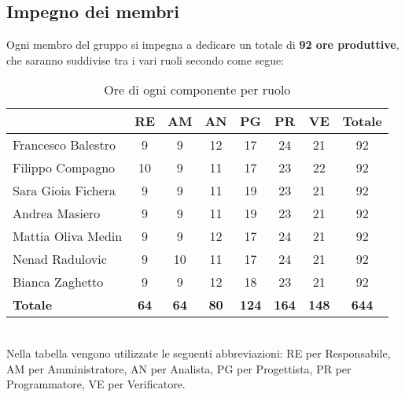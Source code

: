 \documentclass[a4paper,12pt]{article}
\begin{document}
{        \subsection{Impegno dei membri} {
            Ogni membro del gruppo si impegna a dedicare un totale di \textbf{92 ore produttive}, che saranno suddivise tra i vari ruoli secondo come segue:\\
            \begin{table}[h!]
                \centering
                \begin{tabularx}{\textwidth}{|X|c|c|c|c|c|c|c|}
                    \hline
                    \rowcolor{lightgray}
                    \multicolumn{1}{|c|}{} & \textbf{RE} & \textbf{AM} & \textbf{AN} & \textbf{PG} & \textbf{PR} & \textbf{VE} & \textbf{Totale} \\
                    \hline
                    Francesco Balestro & 9 & 9 & 12 & 17 & 24 & 21 & 92 \\
                    \hline
                    Filippo Compagno & 10 & 9 & 11 & 17 & 23 & 22 & 92 \\
                    \hline
                    Sara Gioia Fichera & 9 & 9 & 11 & 19 & 23 & 21 & 92 \\
                    \hline
                    Andrea Masiero & 9 & 9 & 11 & 19 & 23 & 21 & 92 \\
                    \hline
                    Mattia Oliva Medin & 9 & 9 & 12 & 17 & 24 & 21 & 92 \\
                    \hline
                    Nenad Radulovic & 9 & 10 & 11 & 17 & 24 & 21 & 92 \\
                    \hline
                    Bianca Zaghetto & 9 & 9 & 12 & 18 & 23 & 21 & 92 \\
                    \hline
                    \textbf{Totale} & \textbf{64} & \textbf{64} & \textbf{80} & \textbf{124} & \textbf{164} & \textbf{148} & \textbf{644} \\
                    \hline
                \end{tabularx}
                \caption{Ore di ogni componente per ruolo}
            \end{table}
            \\
            Nella tabella vengono utilizzate le seguenti abbreviazioni: RE per Responsabile, AM per Amministratore, AN per Analista, PG per Progettista, PR per Programmatore, VE per Verificatore.\\
        }
        \newpage
}
\end{document}
